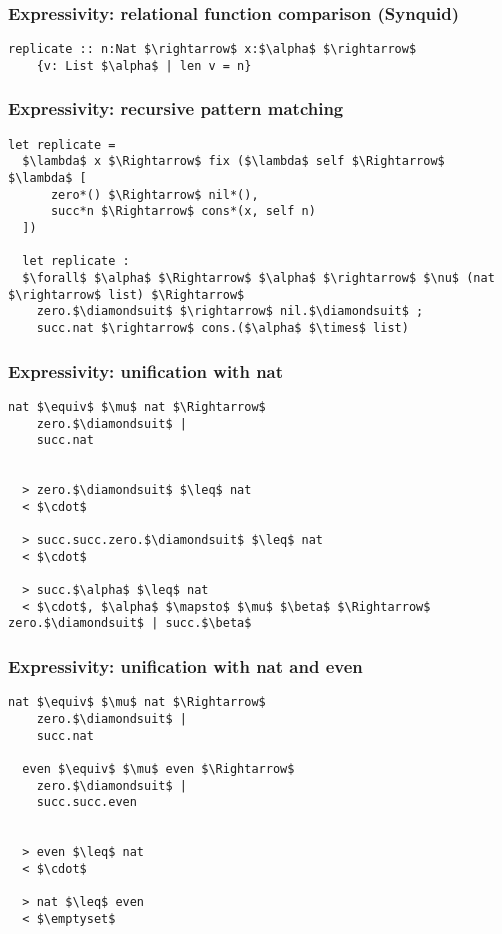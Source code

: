 \documentclass{beamer}
\begin{document}
\begin{frame}[fragile]

  \frametitle{Expressivity: relational function comparison (Synquid)}

  \begin{lstlisting}[keywords={termination, measure, data, where}]
  replicate :: n:Nat $\rightarrow$ x:$\alpha$ $\rightarrow$ 
    {v: List $\alpha$ | len v = n}

  \end{lstlisting}

  \hfill
\end{frame}

\begin{frame}[fragile]
  \frametitle{Expressivity: recursive pattern matching}
  \begin{lstlisting}[]
  let replicate = 
  $\lambda$ x $\Rightarrow$ fix ($\lambda$ self $\Rightarrow$ $\lambda$ [
      zero*() $\Rightarrow$ nil*(),
      succ*n $\Rightarrow$ cons*(x, self n)
  ])

  let replicate : 
  $\forall$ $\alpha$ $\Rightarrow$ $\alpha$ $\rightarrow$ $\nu$ (nat $\rightarrow$ list) $\Rightarrow$ 
    zero.$\diamondsuit$ $\rightarrow$ nil.$\diamondsuit$ ; 
    succ.nat $\rightarrow$ cons.($\alpha$ $\times$ list)
  \end{lstlisting}
\end{frame}


\begin{frame}[fragile]
  \frametitle{Expressivity: unification with nat}

  \begin{lstlisting}[]
  nat $\equiv$ $\mu$ nat $\Rightarrow$ 
    zero.$\diamondsuit$ | 
    succ.nat


  > zero.$\diamondsuit$ $\leq$ nat 
  < $\cdot$

  > succ.succ.zero.$\diamondsuit$ $\leq$ nat 
  < $\cdot$

  > succ.$\alpha$ $\leq$ nat 
  < $\cdot$, $\alpha$ $\mapsto$ $\mu$ $\beta$ $\Rightarrow$ zero.$\diamondsuit$ | succ.$\beta$
  \end{lstlisting} 

\end{frame}

\begin{frame}[fragile]
  \frametitle{Expressivity: unification with nat and even}

  \begin{lstlisting}[]
  nat $\equiv$ $\mu$ nat $\Rightarrow$ 
    zero.$\diamondsuit$ | 
    succ.nat

  even $\equiv$ $\mu$ even $\Rightarrow$ 
    zero.$\diamondsuit$ | 
    succ.succ.even 


  > even $\leq$ nat 
  < $\cdot$

  > nat $\leq$ even 
  < $\emptyset$
  \end{lstlisting} 

\end{frame}
\end{document}
